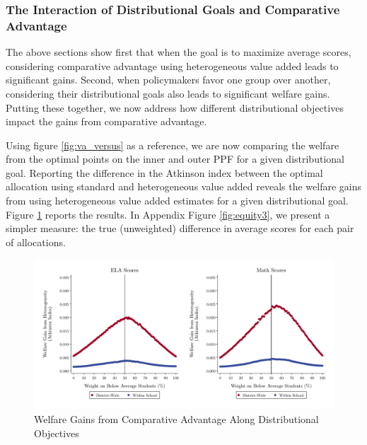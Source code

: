\documentclass[12pt]{article}
\theoremstyle{definition}
\theoremstyle{definition}
\theoremstyle{definition}
\theoremstyle{definition}
\begin{document}
\subsubsection{The Interaction of Distributional Goals and Comparative Advantage}

The above sections show first that when the goal is to maximize average scores, considering comparative advantage using heterogeneous value added leads to significant gains. Second, when policymakers favor one group over another, considering their distributional goals also leads to significant welfare gains. Putting these together, we now address how different distributional objectives impact the gains from comparative advantage. 

Using figure \ref{fig:va_versus} as a reference, we are now comparing the welfare from the optimal points on the inner and outer PPF for a given distributional goal. Reporting the difference in the Atkinson index between the optimal allocation using standard and heterogeneous value added reveals the welfare gains from using heterogeneous value added estimates for a given distributional goal. Figure \ref{fig:equity1b} reports the results.  In Appendix Figure \ref{fig:equity3}, we present a simpler measure: the true (unweighted) difference in average scores for each pair of allocations. 


\begin{figure}[htpb]

\centering
\includegraphics[width=.9\textwidth]{Working_Paper/test_figures/03f_reallocation.pdf}
    \caption{Welfare Gains from Comparative Advantage Along Distributional Objectives }
    \label{fig:equity1b}

    
\end{figure}
\end{document}
